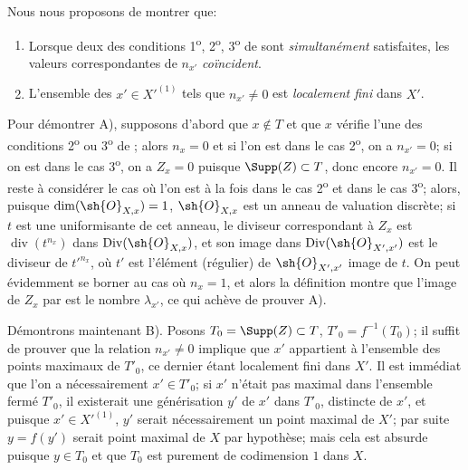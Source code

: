 \begin{env}[21.10.2]
\label{IV.21.10.2}
Nous nous proposons de montrer que:
\begin{enumerate}[label=\emph{\Alph*)}]
  \item Lorsque deux des conditions 1\textsuperscript{o}, 2\textsuperscript{o}, 3\textsuperscript{o} de  sont \emph{simultanément} satisfaites, les valeurs correspondantes de $n_{x'}$ \emph{coïncident}.
  \item L'ensemble des $x'\in X'^{(1)}$ tels que $n_{x'}\neq0$ est \emph{localement fini} dans $X'$.
\end{enumerate}

Pour démontrer A), supposons d'abord que $x\notin T$ et que $x$ vérifie l'une des conditions 2\textsuperscript{o} ou 3\textsuperscript{o} de ;
alors $n_x=0$ et si l'on est dans le cas 2\textsuperscript{o}, on a $n_{x'}=0$;
si on est dans le cas 3\textsuperscript{o}, on a $Z_x=0$ puisque $\Supp(Z)\subset T$, donc encore $n_{x'}=0$.
Il reste à considérer le cas où l'on est à la fois dans le cas 2\textsuperscript{o} et dans le cas 3\textsuperscript{o};
alors, puisque $\dim(\sh{O}_{X,x})=1$, $\sh{O}_{X,x}$ est un anneau de valuation discrète;
si $t$ est une uniformisante de cet anneau, le diviseur correspondant à $Z_x$ est $\operatorname{div}(t^{n_x})$ dans $\operatorname{Div}(\sh{O}_{X,x})$, et son image dans $\operatorname{Div}(\sh{O}_{X',x'})$ est le diviseur de $t'^{n_x}$, où $t'$ est l'élément (régulier) de $\sh{O}_{X',x'}$ image de $t$.
On peut évidemment se borner au cas où $n_x=1$, et alors la définition  montre que l'image de $Z_x$ par  est le nombre $\lambda_{x'}$, ce qui achève de prouver A).

Démontrons maintenant B).
Posons $T_0=\Supp(Z)\subset T$, $T'_0=f^{-1}(T_0)$;
il suffit de prouver que la relation $n_{x'}\neq0$ implique que $x'$ appartient à l'ensemble des points maximaux de $T'_0$, ce dernier étant localement fini dans $X'$.
Il est immédiat que l'on a nécessairement $x'\in T'_0$;
si $x'$ n'était pas maximal dans l'ensemble fermé $T'_0$, il existerait
une générisation $y'$ de $x'$ dans $T'_0$, distincte de $x'$, et puisque $x'\in X'^{(1)}$, $y'$ serait nécessairement un point maximal de $X'$;
par suite $y=f(y')$ serait point maximal de $X$ par hypothèse;
mais cela est absurde puisque $y\in T_0$ et que $T_0$ est purement de codimension $1$ dans $X$.
\end{env}

